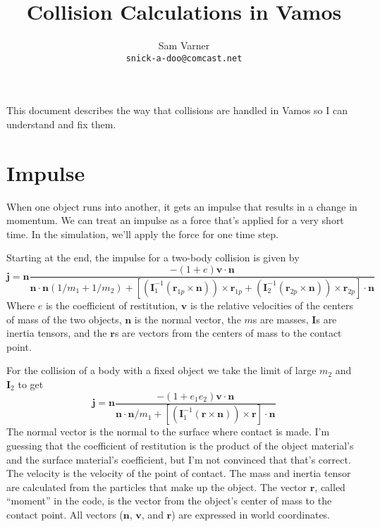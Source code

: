 \documentclass{article}
\begin{document}
\title{Collision Calculations in Vamos}
\author{Sam Varner\\ \texttt{snick-a-doo@comcast.net}}
\maketitle

This document describes the way that collisions are handled in Vamos
so I can understand and fix them.

\section {Impulse}
When one object runs into another, it gets an impulse that results in a
change in momentum.  We can treat an impulse as a force that's applied
for a very short time.  In the simulation, we'll apply the force for
one time step.

Starting at the end, the impulse for a two-body collision is given by
\begin{equation}
  \label{eq:2-body-impulse}
  \mathbf{j}=\mathbf{n} \frac{-(1+e) \mathbf{v} \cdot \mathbf{n}}
  {\mathbf{n} \cdot \mathbf{n} (1/m_1 + 1/m_2) 
    + [(\mathbf{I}_1^{-1} (\mathbf{r}_{1p} \times \mathbf{n})) \times \mathbf{r}_{1p}
    + (\mathbf{I}_2^{-1} (\mathbf{r}_{2p} \times \mathbf{n})) \times \mathbf{r}_{2p}]
    \cdot \mathbf{n}}
\end{equation}
Where $e$ is the coefficient of restitution, $\mathbf{v}$ is the relative
velocities of the centers of mass of the two objects, $\mathbf{n}$ is
the normal vector, the $m$s are masses, $\mathbf{I}$s are inertia
tensors, and the $\mathbf{r}$s are vectors from the centers of mass to
the contact point.

For the collision of a body with a fixed object we take the limit of
large $m_2$ and $\mathbf{I}_2$ to get
\begin{equation}
  \label{eq:1-body-impulse}
  \mathbf{j}=\mathbf{n} \frac{-(1+e_1e_2) \mathbf{v} \cdot \mathbf{n}}
  {\mathbf{n} \cdot \mathbf{n} /m_1
    + [(\mathbf{I}_1^{-1} (\mathbf{r} \times \mathbf{n})) \times \mathbf{r}]
    \cdot \mathbf{n}}
\end{equation}
The normal vector is the normal to the surface where contact is made.
I'm guessing that the coefficient of restitution is the product of the
object material's and the surface material's coefficient, but I'm not
convinced that that's correct.  The velocity is the velocity of the
point of contact.  The mass and inertia tensor are calculated from the
particles that make up the object.  The vector $\mathbf{r}$, called
``moment'' in the code, is the vector from the object's center of mass
to the contact point.  All vectors ($\mathbf{n}$, $\mathbf{v}$, and
$\mathbf{r}$) are expressed in world coordinates.
\end{document}
